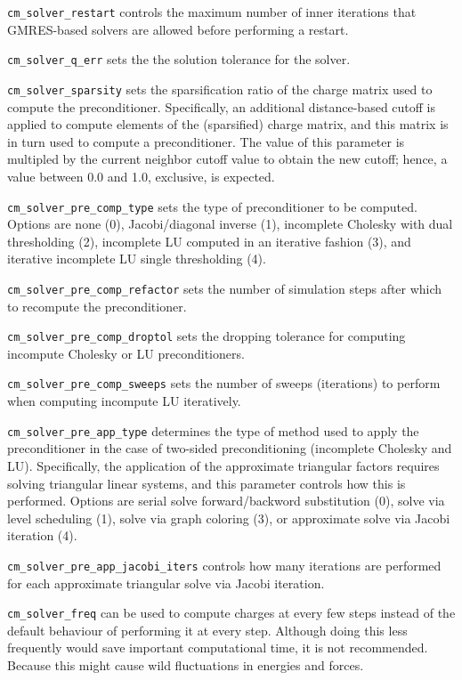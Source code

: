 \documentclass{article}
\begin{document}
{\tt cm\_solver\_restart} controls the maximum number of inner iterations
that GMRES-based solvers are allowed before performing a restart.

{\tt cm\_solver\_q\_err} sets the the solution tolerance for the solver.

{\tt cm\_solver\_sparsity} sets the sparsification ratio of the charge matrix
used to compute the preconditioner. Specifically, an additional distance-based
cutoff is applied to compute elements of the (sparsified) charge matrix, and
this matrix is in turn used to compute a preconditioner. The value of this
parameter is multipled by the current neighbor cutoff value to obtain the new
cutoff; hence, a value between 0.0 and 1.0, exclusive, is expected.

{\tt cm\_solver\_pre\_comp\_type} sets the type of preconditioner to be
computed. Options are none (0), Jacobi/diagonal inverse (1), incomplete
Cholesky with dual thresholding (2), incomplete LU computed in an iterative
fashion (3), and iterative incomplete LU single thresholding (4).

{\tt cm\_solver\_pre\_comp\_refactor} sets the number of simulation steps
after which to recompute the preconditioner.

{\tt cm\_solver\_pre\_comp\_droptol} sets the dropping tolerance for
computing incompute Cholesky or LU preconditioners.

{\tt cm\_solver\_pre\_comp\_sweeps} sets the number of sweeps (iterations)
to perform when computing incompute LU iteratively.

{\tt cm\_solver\_pre\_app\_type} determines the type of method used
to apply the preconditioner in the case of two-sided preconditioning
(incomplete Cholesky and LU). Specifically, the application of the
approximate triangular factors requires solving triangular linear systems,
and this parameter controls how this is performed. Options are serial solve
forward/backword substitution (0), solve via level scheduling (1), solve
via graph coloring (3), or approximate solve via Jacobi iteration (4).

{\tt cm\_solver\_pre\_app\_jacobi\_iters} controls how many iterations
are performed for each approximate triangular solve via Jacobi iteration.

{\tt cm\_solver\_freq} can be used to compute charges at every 
few steps instead of the default behaviour of performing it at every 
step. Although doing this less frequently would save important 
computational time, it is not recommended. Because this might cause wild 
fluctuations in energies and forces.
\end{document}

